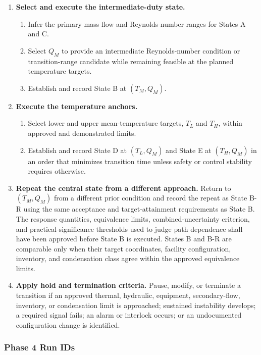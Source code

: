 \documentclass[11pt]{article}
\begin{document}
\begin{enumerate}
    \item \textbf{Select and execute the intermediate-duty state.}
    \begin{enumerate}
        \item Infer the primary mass flow and Reynolds-number ranges for States A and C.
        \item Select $Q_M$ to provide an intermediate Reynolds-number condition or transition-range candidate while remaining feasible at the planned temperature targets.
        \item Establish and record State B at $(T_M,Q_M)$.
    \end{enumerate}

    \item \textbf{Execute the temperature anchors.}
    \begin{enumerate}
        \item Select lower and upper mean-temperature targets, $T_L$ and $T_H$, within approved and demonstrated limits.
        \item Establish and record State D at $(T_L,Q_M)$ and State E at $(T_H,Q_M)$ in an order that minimizes transition time unless safety or control stability requires otherwise.
    \end{enumerate}

    \item \textbf{Repeat the central state from a different approach.}
    Return to $(T_M,Q_M)$ from a different prior condition and record the repeat as State B-R using the same acceptance and target-attainment requirements as State B. The response quantities, equivalence limits, combined-uncertainty criterion, and practical-significance thresholds used to judge path dependence shall have been approved before State B is executed. States B and B-R are comparable only when their target coordinates, facility configuration, inventory, and condensation class agree within the approved equivalence limits.

    \item \textbf{Apply hold and termination criteria.}
    Pause, modify, or terminate a transition if an approved thermal, hydraulic, equipment, secondary-flow, inventory, or condensation limit is approached; sustained instability develops; a required signal fails; an alarm or interlock occurs; or an undocumented configuration change is identified.
\end{enumerate}

\subsubsection{Phase 4 Run IDs}
\end{document}
